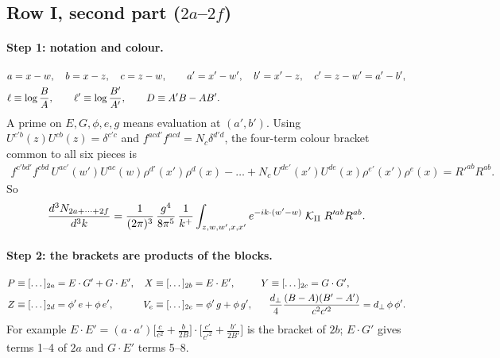 \documentclass[10pt]{article}
\numberwithin{equation}{section}
\begin{document}
\subsection{Row I, second part ($2a$--$2f$)}\label{sec:square}

\paragraph{Step 1: notation and colour.}
\begin{align}
&a=x-w,\quad b=x-z,\quad c=z-w,\qquad a'=x'-w',\quad b'=x'-z,\quad c'=z-w'=a'-b',\notag\\
&\ell\equiv\log\frac{B}{A},\qquad \ell'\equiv\log\frac{B'}{A'},\qquad D\equiv A'B-AB' .
\end{align}
A prime on $E,G,\phi,e,g$ means evaluation at $(a',b')$. Using $U^{c'b}(z)U^{cb}(z)=\delta^{c'c}$ and $f^{acd'}f^{acd}=N_{c}\delta^{d'd}$, the four-term colour bracket common to all six pieces is
\begin{align}
f^{c'bd'}f^{cbd}\,U^{ac'}(w')U^{ac}(w)\rho^{d'}(x')\rho^{d}(x)-\dots+N_{c}\,U^{de'}(x')U^{de}(x)\rho^{e'}(x')\rho^{e}(x)=R'^{ab}R^{ab}.
\end{align}
So
\begin{align}
\frac{d^{3}N_{2a+\dots+2f}}{d^{3}k}=\frac{1}{(2\pi)^{3}}\,\frac{g^{4}}{8\pi^{5}}\,\frac{1}{k^{+}}\int_{z,w,w',x,x'}e^{-ik\cdot(w'-w)}\;\mathcal{K}_{\rm II}\;R'^{ab}R^{ab}. \label{eq:GIIdef}
\end{align}

\paragraph{Step 2: the brackets are products of the blocks.}
\begin{align}
P&\equiv[\dots]_{2a}=E\cdot G'+G\cdot E', & X&\equiv[\dots]_{2b}=E\cdot E', & Y&\equiv[\dots]_{2c}=G\cdot G',\notag\\
Z&\equiv[\dots]_{2d}=\phi'\,e+\phi\,e', & V_{e}&\equiv[\dots]_{2e}=\phi'\,g+\phi\,g', & &\frac{d_{\perp}}{4}\frac{(B-A)(B'-A')}{c^{2}c'^{2}}=d_{\perp}\,\phi\,\phi' .
\end{align}
For example $E\cdot E'=(a\cdot a')\big[\tfrac{c}{c^{2}}+\tfrac{b}{2B}\big]\!\cdot\!\big[\tfrac{c'}{c'^{2}}+\tfrac{b'}{2B'}\big]$ is the bracket of $2b$; $E\cdot G'$ gives terms 1--4 of $2a$ and $G\cdot E'$ terms 5--8.
\end{document}
